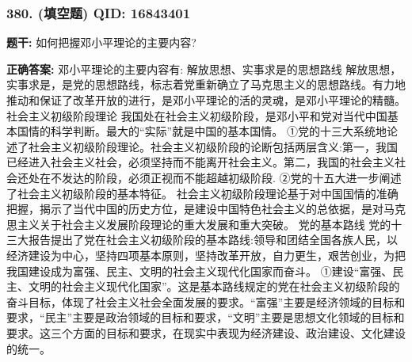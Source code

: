 \documentclass[12pt,UTF8]{ctexart}
\begin{document}
\vspace{0.3em}\hrulefill\vspace{0.7em}

\subsubsection*{380. (填空题) \small QID: 16843401}

\textbf{题干:}
如何把握邓小平理论的主要内容?

\textbf{正确答案:}
邓小平理论的主要内容有:
解放思想、实事求是的思想路线
解放思想，实事求是，是党的思想路线，标志着党重新确立了马克思主义的思想路线。有力地推动和保证了改革开放的进行，是邓小平理论的活的灵魂，是邓小平理论的精髓。
社会主义初级阶段理论
我国处在社会主义初级阶段，是邓小平和党对当代中国基本国情的科学判断。最大的“实际”就是中国的基本国情。
①党的十三大系统地论述了社会主义初级阶段理论。社会主义初级阶段的论断包括两层含义:第一，我国已经进入社会主义社会，必须坚持而不能离开社会主义。第二，我国的社会主义社会还处在不发达的阶段，必须正视而不能超越初级阶段.
②党的十五大进一步阐述了社会主义初级阶段的基本特征。
社会主义初级阶段理论基于对中国国情的准确把握，揭示了当代中国的历史方位，是建设中国特色社会主义的总依据，是对马克思主义关于社会主义发展阶段理论的重大发展和重大突破。
党的基本路线
党的十三大报告提出了党在社会主义初级阶段的基本路线:领导和团结全国各族人民，以经济建设为中心，坚持四项基本原则，坚持改革开放，自力更生，艰苦创业，为把我国建设成为富强、民主、文明的社会主义现代化国家而奋斗。
①建设“富强、民主、文明的社会主义现代化国家”。这是基本路线规定的党在社会主义初级阶段的奋斗目标，体现了社会主义社会全面发展的要求。“富强”主要是经济领域的目标和要求，“民主”主要是政治领域的目标和要求，“文明”主要是思想文化领域的目标和要求。这三个方面的目标和要求，在现实中表现为经济建设、政治建设、文化建设的统一。
\end{document}
